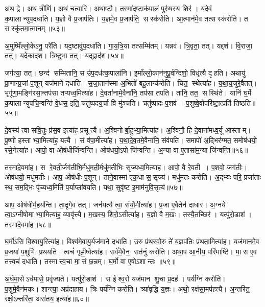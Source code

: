 अथ॒ द्वे।
अथ॒ त्रीणि॑।
अथ॑ च॒त्वारि॑।
अथा॒ष्टौ।
तस्मा॑द॒ष्टाक॑पालं॒ पुरु॑षस्य॒ शिर॑।
यदे॒वं क॒पालान्युप॒दधा॑ति।
य॒ज्ञो वै प्र॒जाप॑तिः।
य॒ज्ञमे॒व प्र॒जाप॑ति॒ सस्क॑रोति।
आ॒त्मान॑मे॒व तत्सस्क॑रोति।
त सस्कृ॑तमा॒त्मानम्॥५३॥

अ॒मुष्मिँ॑ल्लो॒केऽनु॒ परै॑ति।
यद॒ष्टावु॑प॒दधा॑ति।
गा॒य॒त्रि॒या तत्सम्मि॑तम्।
यन्नव॑।
त्रि॒वृता॒ तत्।
यद्दश॑।
वि॒राजा॒ तत्।
यदेका॑दश।
त्रि॒ष्टुभा॒ तत्।
यद्द्वाद॑श॥५४॥

जग॑त्या॒ तत्।
छन्द॑ सम्मितानि॒ स उ॑प॒दध॑त्क॒पाला॑नि।
इ॒माँल्लो॒कान॑नुपू॒र्वन्दिशो॒ विधृ॑त्यै दृहति।
अथायु॑ प्रा॒णान्प्र॒जां प॒शून् यज॑माने दधाति।
स॒जा॒तान॑स्मा अ॒भितो॑ बहु॒लान्क॑रोति।
चित॒ स्थेत्या॑ह।
य॒था॒य॒जुरे॒वैतत्।
भृगू॑णा॒मङ्गि॑रसा॒न्तप॑सा तप्यध्व॒मित्या॑ह।
दे॒वता॑नामे॒वैना॑नि॒ तप॑सा तपति।
तानि॒ तत॒ सस्थि॑ते।
यानि॑ घ॒र्मे क॒पालान्युपचि॒न्वन्ति॑ वे॒धस॒ इति॒ चतु॑ष्पदय॒र्चा वि मु॑ञ्चति।
चतु॑ष्पादः प॒शव॑।
प॒शुष्वे॒वोपरि॑ष्टा॒त्प्रति॑ तिष्ठति॥५५॥\anuvakamend[व॒र्त॒य॒ति॒ दिव॑मे॒वैतेन॑ दृहति स॒म्भव॑ति॒ त सस्कृ॑तमा॒त्मानं॒ द्वाद॑श॒ सस्थि॑ते॒ त्रीणि॑ च]

दे॒वस्य॑ त्वा सवि॒तुः प्र॑स॒व इत्या॑ह॒ प्रसूत्यै।
अ॒श्विनोर्बा॒हुभ्या॒मित्या॑ह।
अ॒श्विनौ॒ हि दे॒वाना॑मध्व॒र्यू आस्ताम्।
पू॒ष्णो हस्ताभ्या॒मित्या॑ह॒ यत्यै।
सं व॑पा॒मीत्या॑ह।
य॒था॒दे॒व॒तमे॒वैना॑नि॒ संव॑पति।
समापो॑ अ॒द्भिर॑ग्मत॒ समोष॑धयो॒ रसे॒नेत्या॑ह।
आपो॒ वा ओष॑धीर्जिन्वन्ति।
ओष॑धयो॒ऽपो जि॑न्वन्ति।
अ॒न्या वा ए॒तासा॑म॒न्या जि॑न्वन्ति॥५६॥

तस्मा॑दे॒वमा॑ह।
स रे॒वती॒र्जग॑तीभि॒र्मधु॑मती॒र्मधु॑मतीभिः सृज्यध्व॒मित्या॑ह।
आपो॒ वै रे॒वती।
प॒शवो॒ जग॑तीः।
ओष॑धयो॒ मधु॑मतीः।
आप॒ ओष॑धीः प॒शून्।
ताने॒वास्मा॑ एक॒धा स॒सृज्य॑।
मधु॑मतः करोति।
अ॒द्भ्यः परि॒ प्रजा॑ताः स्थ॒ सम॒द्भिः पृ॑च्यध्व॒मिति॑ प॒र्याप्ला॑वयति।
यथा॒ सुवृ॑ष्ट इ॒माम॑नुवि॒सृत्य॑॥५७॥

आप॒ ओष॑धीर्म॒हय॑न्ति।
ता॒दृगे॒व तत्।
जन॑यत्यै त्वा॒ संयौ॒मीत्या॑ह।
प्र॒जा ए॒वैतेन॑ दाधार।
अ॒ग्नये त्वा॒ऽग्नीषोमाभ्या॒मित्या॑ह॒ व्यावृ॑त्त्यै।
म॒खस्य॒ शिरो॒ऽसीत्या॑ह।
य॒ज्ञो वै म॒खः।
तस्यै॒तच्छिर॑।
यत्पु॑रो॒डाश॑।
तस्मा॑दे॒वमा॑ह॥५८॥

घ॒र्मो॑ऽसि वि॒श्वायु॒रित्या॑ह।
विश्व॑मे॒वायु॒र्यज॑माने दधाति।
उ॒रु प्र॑थस्वो॒रु ते॑ य॒ज्ञप॑तिः प्रथता॒मित्या॑ह।
यज॑मानमे॒व प्र॒जया॑ प॒शुभि॑ प्रथयति।
त्वचं॑ गृह्णी॒ष्वेत्या॑ह।
सर्व॑मे॒वैन॒ सत॑नुं करोति।
अथा॒प आ॒नीय॒ परि॑मार्ष्टि।
मा॒स ए॒व तत्त्वचं॑ दधाति।
तस्मात्त्व॒चा मा॒सं छ॒न्नम्।
घ॒र्मो वा ए॒षोऽशान्तः ॥५९॥

अ॒र्ध॒मा॒सेऽर्धमासे॒ प्रवृ॑ज्यते।
यत्पु॑रो॒डाश॑।
स ईश्व॒रो यज॑मान शु॒चा प्र॒दह॑।
पर्य॑ग्नि करोति।
प॒शुमे॒वैन॑मकः।
शान्त्या॒ अप्र॑दाहाय।
त्रिः पर्य॑ग्नि करोति।
त्र्या॑वृ॒द्धि य॒ज्ञः।
अथो॒ रक्ष॑सा॒मप॑हत्यै।
अ॒न्तरि॑त॒ रक्षो॒ऽन्तरि॑ता॒ अरा॑तय॒ इत्या॑ह॥६०॥


